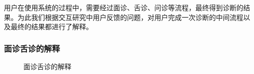 用户在使用系统的过程中，需要经过面诊、舌诊、问诊等流程，最终得到诊断的结果。为此我们根据交互研究中用户反馈的问题，对用户完成一次诊断的中间流程以及最终的结果都进行了解释。

\subsubsection{面诊舌诊的解释}

\begin{figure}[htbp]   
    \centering
    \caption{面诊舌诊的解释}
    \label{fig:face_diags}
\end{figure}

